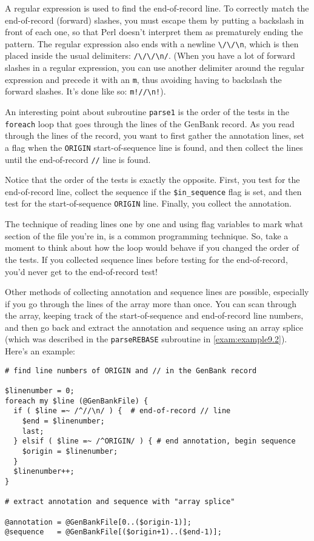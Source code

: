 A regular expression is used to find the end-of-record line. To correctly match the end-of-record (forward) slashes, you must escape them by putting a backslash in front of each one, so that Perl doesn't interpret them as prematurely ending the pattern. The regular expression also ends with a newline \verb|\/\/\n|, which is then placed inside the usual delimiters: \verb|/\/\/\n/|. (When you have a lot of forward slashes in a regular expression, you can use another delimiter around the regular expression and precede it with an \verb|m|, thus avoiding having to backslash the forward slashes. It's done like so: \verb|m!//\n!|).

An interesting point about subroutine \verb|parse1| is the order of the tests in the \verb|foreach| loop that goes through the lines of the GenBank record. As you read through the lines of the record, you want to first gather the annotation lines, set a flag when the \verb|ORIGIN| start-of-sequence line is found, and then collect the lines until the end-of-record \verb|//| line is found.

Notice that the order of the tests is exactly the opposite. First, you test for the end-of-record line, collect the sequence if the \verb|$in_sequence| flag is set, and then test for the start-of-sequence \verb|ORIGIN| line. Finally, you collect the annotation.

The technique of reading lines one by one and using flag variables to mark what section of the file you're in, is a common programming technique. So, take a moment to think about how the loop would behave if you changed the order of the tests. If you collected sequence lines before testing for the end-of-record, you'd never get to the end-of-record test!

Other methods of collecting annotation and sequence lines are possible, especially if you go through the lines of the array more than once. You can scan through the array, keeping track of the start-of-sequence and end-of-record line numbers, and then go back and extract the annotation and sequence using an array splice (which was described in the \verb|parseREBASE| subroutine in \autoref{exam:example9.2}). Here's an example:

\begin{lstlisting}
# find line numbers of ORIGIN and // in the GenBank record

$linenumber = 0;
foreach my $line (@GenBankFile) {
  if ( $line =~ /^//\n/ ) {  # end-of-record // line
    $end = $linenumber;
    last;
  } elsif ( $line =~ /^ORIGIN/ ) { # end annotation, begin sequence
    $origin = $linenumber;
  }
  $linenumber++;
}

# extract annotation and sequence with "array splice"

@annotation = @GenBankFile[0..($origin-1)];
@sequence   = @GenBankFile[($origin+1)..($end-1)];
\end{lstlisting}

